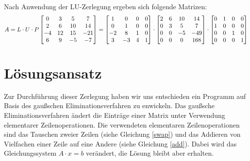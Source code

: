 \documentclass[course=erap]{aspdoc}
\begin{document}
Nach Anwendung der LU-Zerlegung ergeben sich folgende Matrizen:
  \begin{equation}
  A = L \cdot U \cdot P
  
  \centering
  \begin{bmatrix}
    0	& 3	 & 5  & 7 \\
    2	& 6	 & 10 & 14 \\
    -4	& 12 & 15 & -21\\
    6	& 9  & -5 & -7\\
    \end{bmatrix}
     =
    \begin{bmatrix}
    1	& 0	 & 0  & 0 \\
    0	& 1	 & 0 & 0 \\
    -2	& 8 & 1 & 0\\
    3	& -3  & 4 & 1\\
    \end{bmatrix}
   \cdot
    \begin{bmatrix}
    2	& 6	 & 10 & 14 \\
    0	& 3	 & 5 &  7 \\
    0	& 0  & -5 & -49\\
    0	& 0  & 0 &  168\\
    \end{bmatrix}
    \cdot
    \begin{bmatrix}
    0	& 1	 & 0 & 0 \\
    1	& 0	 & 0 & 0 \\
    0	& 0  & 1 & 0\\
    0	& 0  & 0 & 1\\
    \end{bmatrix}
 
  \end{equation}
 
 

\section{Lösungsansatz}
Zur Durchführung dieser Zerlegung haben wir uns entschieden ein Programm auf Basis des gaußschen Eliminationsverfahren zu enwickeln.
Das gaußsche Eliminationsverfahren ändert die Einträge einer Matrix unter Verwendung elementarer Zeilenoperationen.
Die verwendeten elementaren Zeilenoperationen sind das Tauschen zweier Zeilen (siehe Gleichung \ref{swap}) und 
das Addieren von Vielfachen einer Zeile auf eine Andere (siehe Gleichung \ref{add}). 
Dabei wird das Gleichungssystem $A \cdot x = b$ verändert, die Lösung bleibt aber erhalten.\\
\end{document}
